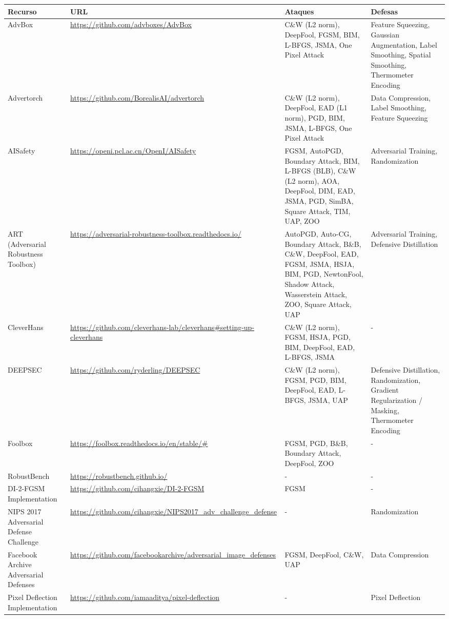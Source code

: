 \begin{landscape}
\begin{quadro}[!htp]
\centering
\caption{Exemplo de quadro.}
\label{quad:quadro1}
\scriptsize

\begin{tabular}{|p{2.5cm}|p{5cm}|p{8cm}|p{6cm}|}
\hline
\textbf{Recurso} & \textbf{URL} & \textbf{Ataques} & \textbf{Defesas} \\
\hline
AdvBox & \url{https://github.com/advboxes/AdvBox} & C\&W (L2 norm), DeepFool, FGSM, BIM, L-BFGS, JSMA, One Pixel Attack & Feature Squeezing, Gaussian Augmentation, Label Smoothing, Spatial Smoothing, Thermometer Encoding \\
\hline
Advertorch & \url{https://github.com/BorealisAI/advertorch} & C\&W (L2 norm), DeepFool, EAD (L1 norm), PGD, BIM, JSMA, L-BFGS, One Pixel Attack & Data Compression, Label Smoothing, Feature Squeezing \\
\hline
AISafety & \url{https://openi.pcl.ac.cn/OpenI/AISafety} & FGSM, AutoPGD, Boundary Attack, BIM, L-BFGS (BLB), C\&W (L2 norm), AOA, DeepFool, DIM, EAD, JSMA, PGD, SimBA, Square Attack, TIM, UAP, ZOO & Adversarial Training, Randomization \\
\hline
ART (Adversarial Robustness Toolbox) & \url{https://adversarial-robustness-toolbox.readthedocs.io/} & AutoPGD, Auto-CG, Boundary Attack, B\&B, C\&W, DeepFool, EAD, FGSM, JSMA, HSJA, BIM, PGD, NewtonFool, Shadow Attack, Wasserstein Attack, ZOO, Square Attack, UAP & Adversarial Training, Defensive Distillation \\
\hline
CleverHans & \url{https://github.com/cleverhans-lab/cleverhans#setting-up-cleverhans} & C\&W (L2 norm), FGSM, HSJA, PGD, BIM, DeepFool, EAD, L-BFGS, JSMA & - \\
\hline
DEEPSEC & \url{https://github.com/ryderling/DEEPSEC} & C\&W (L2 norm), FGSM, PGD, BIM, DeepFool, EAD, L-BFGS, JSMA, UAP & Defensive Distillation, Randomization, Gradient Regularization / Masking, Thermometer Encoding \\
\hline
Foolbox & \url{https://foolbox.readthedocs.io/en/stable/#} & FGSM, PGD, B\&B, Boundary Attack, DeepFool, ZOO & - \\
\hline
RobustBench & \url{https://robustbench.github.io/} & - & - \\
\hline
DI-2-FGSM Implementation & \url{https://github.com/cihangxie/DI-2-FGSM} & FGSM & - \\
\hline
NIPS 2017 Adversarial Defense Challenge & \url{https://github.com/cihangxie/NIPS2017_adv_challenge_defense} & - & Randomization \\
\hline
Facebook Archive Adversarial Defenses & \url{https://github.com/facebookarchive/adversarial_image_defenses} & FGSM, DeepFool, C\&W, UAP & Data Compression \\
\hline
Pixel Deflection Implementation & \url{https://github.com/iamaaditya/pixel-deflection} & - & Pixel Deflection \\
\hline
\end{tabular}

\fonteautor
\end{quadro}
\end{landscape}
